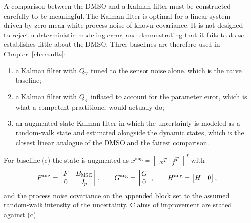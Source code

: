 A comparison between the DMSO and a Kalman filter must be constructed carefully
to be meaningful. The Kalman filter is optimal for a linear system driven by
zero-mean white process noise of known covariance. It is not designed to reject
a deterministic modeling error, and demonstrating that it fails to do so
establishes little about the DMSO. Three baselines are therefore used in
Chapter~\ref{ch:results}:
\begin{enumerate}[label=(\alph*),leftmargin=*]
\item a Kalman filter with $Q_{\mathrm{K}}$ tuned to the sensor noise alone,
which is the naive baseline;
\item a Kalman filter with $Q_{\mathrm{K}}$ inflated to account for the
parameter error, which is what a competent practitioner would actually do;
\item an augmented-state Kalman filter in which the uncertainty is modeled as a
random-walk state and estimated alongside the dynamic states, which is the
closest linear analogue of the DMSO and the fairest comparison.
\end{enumerate}
For baseline (c) the state is augmented as
$x^{\mathrm{aug}}=\begin{bmatrix}x^T&f^T\end{bmatrix}^T$ with
\begin{equation}\label{eq:augkf}
F^{\mathrm{aug}}=\begin{bmatrix}F&B_{\mathrm{MSO}}\\0&I_p\end{bmatrix},
\qquad
G^{\mathrm{aug}}=\begin{bmatrix}G\\0\end{bmatrix},
\qquad
H^{\mathrm{aug}}=\begin{bmatrix}H&0\end{bmatrix},
\end{equation}
and the process noise covariance on the appended block set to the assumed
random-walk intensity of the uncertainty. Claims of improvement are stated
against (c).
